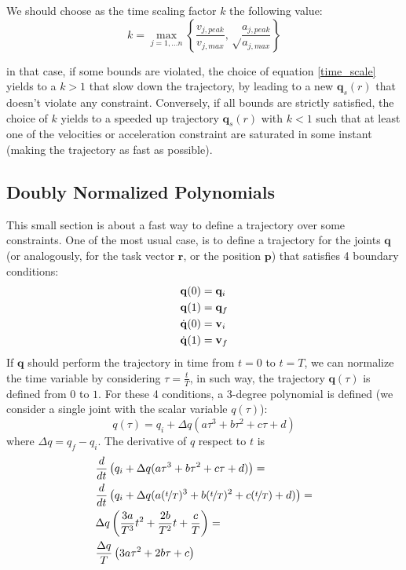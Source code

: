 \documentclass[10pt, letterpaper]{report}
\begin{document}
We should choose as the time scaling factor $k$ the following value:\begin{equation}\label{time_scale}
    k=\max_{j=1,\dots n}\left\{\frac{v_{j,peak}}{v_{j,max}},\sqrt\frac{a_{j,peak}}{a_{j,max}}\right\}
\end{equation}

in that case, if some bounds are violated, the choice of equation \eqref{time_scale} yields to a $k>1$ that slow down the trajectory, by leading to a new $\mathbf q_s(r)$ that doesn't violate any constraint. Conversely, if all bounds are strictly satisfied, the choice of $k$ yields to a speeded up trajectory $\mathbf q_s(r)$ with $k<1$ such that at least one of the velocities or acceleration constraint are saturated in some instant (making the trajectory as fast as possible).
\subsection{Doubly Normalized Polynomials}
This small section is about a fast way to define a trajectory over some constraints. One of the most usual case, is to define a trajectory for the joints $\mathbf q$ (or analogously, for the task vector $\mathbf r$, or the position $\mathbf p$) that satisfies 4 boundary conditions:\begin{align}
    &\mathbf q(0)=\mathbf q_i \\ 
    &\mathbf q(1)=\mathbf q_f \\ 
    &{\dot{\mathbf q}}(0)=\mathbf v_i\\ 
    &{\dot{\mathbf q}}(1)=\mathbf{v}_f
\end{align}
If $\mathbf q$ should perform the trajectory in time from $t=0$ to $t=T$, we can normalize the time variable by considering $\tau=\frac{t}{T}$, in such way, the trajectory $\mathbf q(\tau)$ is defined from $0$ to $1$. For these 4 conditions, a 3-degree polynomial is defined (we consider a single joint with the scalar variable $q(\tau)$):\begin{equation}
    q(\tau)=q_i+\Delta q(a\tau^3+b\tau^2+c\tau+d)
\end{equation}
where $\Delta q=q_f-q_i$. The derivative of $q$ respect to $t$ is\begin{align}
    &\frac{d}{dt}\left(q_i+\Delta q(a\tau^3+b\tau^2+c\tau+d)\right)=\\
    &\frac{d}{dt}\left(q_i+\Delta q(a(\nicefrac{t}{T})^3+b(\nicefrac{t}{T})^2+c(\nicefrac{t}{T})+d)\right)=\\ 
    &\Delta q\left(\frac{3a}{T^3}t^2+\frac{2b}{T^2}t+\frac{c}{T}\right)=\\ 
    &\frac{\Delta q}{T}\left({3a}\tau^2+{2b}\tau+{c}\right)
\end{align}
\end{document}
